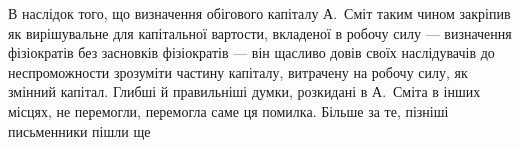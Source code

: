 В наслідок того, що визначення обігового капіталу А.~Сміт таким
чином закріпив як вирішувальне для капітальної вартости, вкладеної в робочу
силу — визначення фізіократів без засновків фізіократів — він щасливо
довів своїх наслідувачів до неспроможности зрозуміти частину капіталу,
витрачену на робочу силу, як змінний капітал. Глибші й правильніші
думки, розкидані в А.~Сміта в інших місцях, не перемогли, перемогла
саме ця помилка. Більше за те, пізніші письменники пішли ще
\parbreak{}  %
